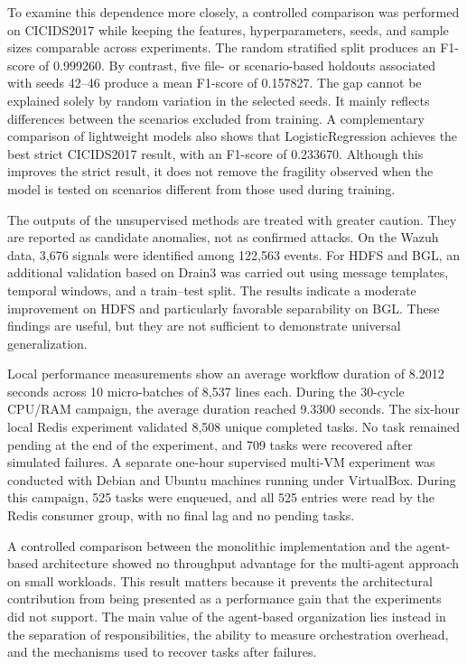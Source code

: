 \documentclass[12pt,a4paper,oneside]{report}
\begin{document}
To examine this dependence more closely, a controlled comparison was performed on CICIDS2017 while keeping the features, hyperparameters, seeds, and sample sizes comparable across experiments. The random stratified split produces an F1-score of 0.999260. By contrast, five file- or scenario-based holdouts associated with seeds 42--46 produce a mean F1-score of 0.157827. The gap cannot be explained solely by random variation in the selected seeds. It mainly reflects differences between the scenarios excluded from training. A complementary comparison of lightweight models also shows that LogisticRegression achieves the best strict CICIDS2017 result, with an F1-score of 0.233670. Although this improves the strict result, it does not remove the fragility observed when the model is tested on scenarios different from those used during training.

The outputs of the unsupervised methods are treated with greater caution. They are reported as candidate anomalies, not as confirmed attacks. On the Wazuh data, 3,676 signals were identified among 122,563 events. For HDFS and BGL, an additional validation based on Drain3 was carried out using message templates, temporal windows, and a train--test split. The results indicate a moderate improvement on HDFS and particularly favorable separability on BGL. These findings are useful, but they are not sufficient to demonstrate universal generalization.

Local performance measurements show an average workflow duration of 8.2012 seconds across 10 micro-batches of 8,537 lines each. During the 30-cycle CPU/RAM campaign, the average duration reached 9.3300 seconds. The six-hour local Redis experiment validated 8,508 unique completed tasks. No task remained pending at the end of the experiment, and 709 tasks were recovered after simulated failures. A separate one-hour supervised multi-VM experiment was conducted with Debian and Ubuntu machines running under VirtualBox. During this campaign, 525 tasks were enqueued, and all 525 entries were read by the Redis consumer group, with no final lag and no pending tasks.

A controlled comparison between the monolithic implementation and the agent-based architecture showed no throughput advantage for the multi-agent approach on small workloads. This result matters because it prevents the architectural contribution from being presented as a performance gain that the experiments did not support. The main value of the agent-based organization lies instead in the separation of responsibilities, the ability to measure orchestration overhead, and the mechanisms used to recover tasks after failures.
\end{document}
